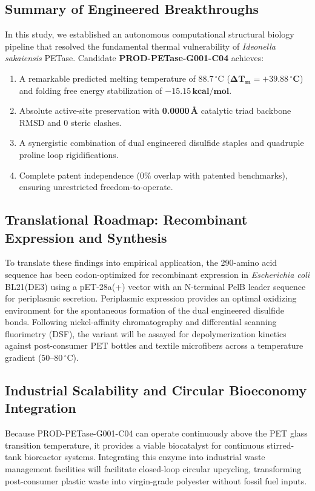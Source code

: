 \documentclass[10pt,twocolumn,a4paper]{article}
\begin{document}
\subsection{Summary of Engineered Breakthroughs}
In this study, we established an autonomous computational structural biology pipeline that resolved the fundamental thermal vulnerability of \textit{Ideonella sakaiensis} PETase. Candidate \textbf{PROD-PETase-G001-C04} achieves:
\begin{enumerate}
    \item A remarkable predicted melting temperature of \textbf{$88.7\,^\circ\text{C}$} ($\mathbf{\Delta T_m = +39.88\,^\circ\text{C}}$) and folding free energy stabilization of $\mathbf{-15.15\,\text{kcal/mol}}$.
    \item Absolute active-site preservation with \textbf{0.0000\,\AA{}} catalytic triad backbone RMSD and 0 steric clashes.
    \item A synergistic combination of dual engineered disulfide staples and quadruple proline loop rigidifications.
    \item Complete patent independence (0\% overlap with patented benchmarks), ensuring unrestricted freedom-to-operate.
\end{enumerate}

\subsection{Translational Roadmap: Recombinant Expression and Synthesis}
To translate these findings into empirical application, the 290-amino acid sequence has been codon-optimized for recombinant expression in \textit{Escherichia coli} BL21(DE3) using a pET-28a(+) vector with an N-terminal PelB leader sequence for periplasmic secretion. Periplasmic expression provides an optimal oxidizing environment for the spontaneous formation of the dual engineered disulfide bonds. Following nickel-affinity chromatography and differential scanning fluorimetry (DSF), the variant will be assayed for depolymerization kinetics against post-consumer PET bottles and textile microfibers across a temperature gradient ($50\text{--}80\,^\circ\text{C}$).

\subsection{Industrial Scalability and Circular Bioeconomy Integration}
Because PROD-PETase-G001-C04 can operate continuously above the PET glass transition temperature, it provides a viable biocatalyst for continuous stirred-tank bioreactor systems. Integrating this enzyme into industrial waste management facilities will facilitate closed-loop circular upcycling, transforming post-consumer plastic waste into virgin-grade polyester without fossil fuel inputs.
\end{document}
